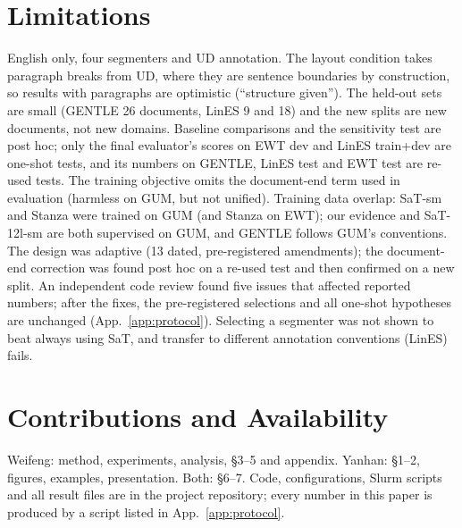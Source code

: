 
\section*{Limitations}
English only, four segmenters and UD annotation. The layout condition takes paragraph breaks from UD, where they are
sentence boundaries by construction, so results with paragraphs are optimistic (``structure given''). The held-out sets are
small (GENTLE 26 documents, LinES 9 and 18) and the new splits are new documents, not new domains. Baseline comparisons
and the sensitivity test are post hoc; only the final evaluator's scores on EWT dev and LinES train+dev are one-shot tests,
and its numbers on GENTLE, LinES test and EWT test are re-used tests. The training objective omits the document-end term
used in evaluation (harmless on GUM, but not unified). Training data overlap: SaT-sm and Stanza were trained on GUM (and
Stanza on EWT); our evidence and SaT-12l-sm are both supervised on GUM, and GENTLE follows GUM's conventions. The design
was adaptive (13 dated, pre-registered amendments); the document-end correction was found post hoc on a re-used test and
then confirmed on a new split. An independent code review found five issues that affected reported numbers; after the
fixes, the pre-registered selections and all one-shot hypotheses are unchanged (App.~\ref{app:protocol}). Selecting a
segmenter was not shown to beat always using SaT, and transfer to different annotation conventions (LinES) fails.

\section*{Contributions and Availability}
Weifeng: method, experiments, analysis, \S3--5 and appendix. Yanhan: \S1--2, figures, examples, presentation. Both:
\S6--7. Code, configurations, Slurm scripts and all result files are in the project repository; every number in this
paper is produced by a script listed in App.~\ref{app:protocol}.
